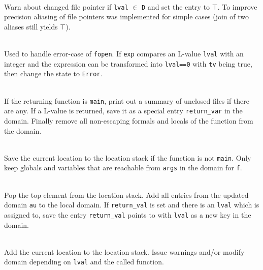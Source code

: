 \begin{description}
\item {}\\
Warn about changed file pointer if \verb|lval| $\in$ \verb|D| and set the entry to $\top$.
To improve precision aliasing of file pointers was implemented for simple cases (join of two aliases still yields $\top$).

\item {}\\
Used to handle error-case of \verb|fopen|. If \verb|exp| compares an L-value \verb|lval| with an integer and the expression can be transformed into \verb|lval==0| with \verb|tv| being true, then change the state to \verb|Error|.


\item {}\\
If the returning function is \verb|main|, print out a summary of unclosed files if there are any.
If a L-value is returned, save it as a special entry \verb|return_var| in the domain.
Finally remove all non-escaping formals and locals of the function from the domain.

\item {}\\
Save the current location to the location stack if the function is not \verb|main|. Only keep globals and variables that are reachable from \verb|args| in the domain for \verb|f|.

\item {}\\
Pop the top element from the location stack.
Add all entries from the updated domain \verb|au| to the local domain.
If \verb|return_val| is set and there is an \verb|lval| which is assigned to, save the entry \verb|return_val| points to with \verb|lval| as a new key in the domain.

\item {}\\
Add the current location to the location stack. Issue warnings and/or modify domain depending on \verb|lval| and the called function.
\end{description}

